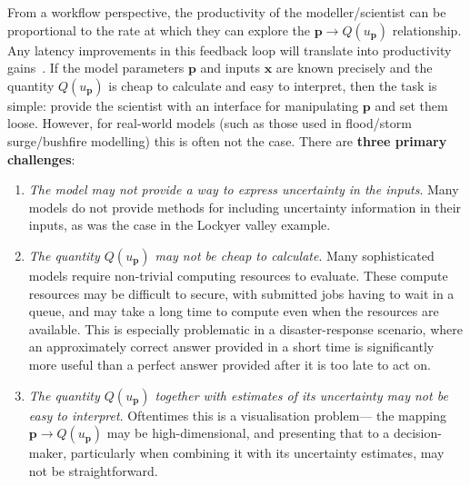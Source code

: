 \documentclass[a4paper,fontsize=12pt]{scrartcl}
\begin{document}
From a workflow perspective, the productivity of the modeller/scientist can be 
proportional to the rate at which they can explore the
$\mathbf{p} \rightarrow Q(u_{\mathbf{p}})$ relationship. Any latency
improvements in this feedback loop will translate into productivity
gains~\parencite{liu_effects_2014}.
If the model parameters $\mathbf{p}$ and inputs $\mathbf{x}$ are known
precisely and the quantity $Q(u_{\mathbf{p}})$ is cheap to calculate
and easy to interpret, then the task is simple: provide the scientist
with an interface for manipulating $\mathbf{p}$ and set them loose.
However, for real-world models (such as those used in flood/storm
surge/bushfire modelling) this is often not the case. There are \textbf{three
primary challenges}:
\begin{enumerate}
\item \emph{The model may not provide a way to express uncertainty in
    the inputs}. Many models do not provide methods for including
  uncertainty information in their inputs, as was the case in the
  Lockyer valley example.
\item \emph{The quantity $Q(u_{\mathbf{p}})$ may not be cheap to
    calculate}. Many
  sophisticated models require non-trivial computing resources to evaluate. These compute resources may be
  difficult to secure, with submitted jobs having to wait in a queue, and may
  take a long time to compute even when the resources are available.
  This is especially problematic in a disaster-response scenario,
  where an approximately correct answer provided in a short time is
  significantly more useful than a perfect answer provided after it is
  too late to act on.
\item \emph{The quantity $Q(u_{\mathbf{p}})$ together with estimates of its uncertainty may not be easy to
    interpret}. Oftentimes this is a visualisation problem---
  the mapping $\mathbf{p} \rightarrow Q(u_{\mathbf{p}})$ may be high-dimension\-al,
  and presenting that to a decision-maker, particularly when combining it with its uncertainty estimates, may not be straightforward.
\end{enumerate}
\end{document}
